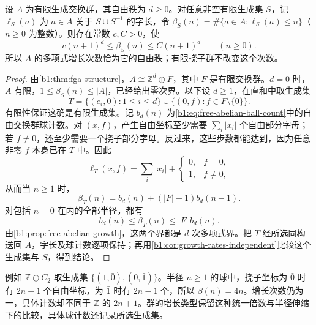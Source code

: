 \begin{proposition}\label{b1:prop:fg-abelian-growth}
	设 \(A\) 为有限生成交换群，其自由秩为 \(d\ge0\)。对任意非空有限生成集 \(S\)，记 \(\ell_S(a)\) 为 \(a\in A\) 关于 \(S\cup S^{-1}\) 的字长，令 \(\beta_S(n)=\#\{a\in A:\ell_S(a)\le n\}\)（\(n\ge0\) 为整数）。则存在常数 \(c,C>0\)，使
	\[
		c(n+1)^d\le\beta_S(n)\le C(n+1)^d\qquad(n\ge0).
	\]
	所以 \(A\) 的多项式增长次数恰为它的自由秩；有限挠子群不改变这个次数。
\end{proposition}
\begin{proof}
	由\cref{b1:thm:fga-structure}，\(A\cong\mathbb Z^d\oplus F\)，其中 \(F\) 是有限交换群。\(d=0\) 时，\(A\) 有限，\(1\le\beta_S(n)\le|A|\)，已经给出零次界。以下设 \(d\ge1\)，在直和中取生成集
	\[
		T=\{(e_i,0):1\le i\le d\}\cup\{(0,f):f\in F\setminus\{0\}\}.
	\]
	有限性保证这确是有限生成集。记 \(b_d(n)\) 为\eqref{b1:eq:free-abelian-ball-count}中的自由交换群球计数。对 \((x,f)\)，产生自由坐标至少需要 \(\sum_i|x_i|\) 个自由部分字母；若 \(f\ne0\)，还至少需要一个挠子部分字母。反过来，这些步数都能达到，因为任意非零 \(f\) 本身已在 \(T\) 中。因此
	\[
		\ell_T(x,f)=\sum_i|x_i|+
		\begin{cases}0,&f=0,\\1,&f\ne0,\end{cases}
	\]
	从而当 \(n\ge1\) 时，
	\[
		\beta_T(n)=b_d(n)+(|F|-1)b_d(n-1).
	\]
	对包括 \(n=0\) 在内的全部半径，都有
	\[
		b_d(n)\le\beta_T(n)\le |F|\,b_d(n).
	\]
	由\cref{b1:prop:free-abelian-growth}，这两个界都是 \(d\) 次多项式界。把 \(T\) 经所选同构送回 \(A\)，字长及球计数逐项保持；再用\cref{b1:cor:growth-rates-independent}比较这个生成集与 \(S\)，得到结论。
\end{proof}

例如 \(\mathbb Z\oplus C_2\) 取生成集 \(\{(1,\bar0),(0,\bar1)\}\)。半径 \(n\ge1\) 的球中，挠子坐标为 \(\bar0\) 时有 \(2n+1\) 个自由坐标，为 \(\bar1\) 时有 \(2n-1\) 个，所以 \(\beta(n)=4n\)。增长次数仍为一，具体计数却不同于 \(\mathbb Z\) 的 \(2n+1\)。群的增长类型保留这种统一倍数与半径伸缩下的比较，具体球计数还记录所选生成集。
